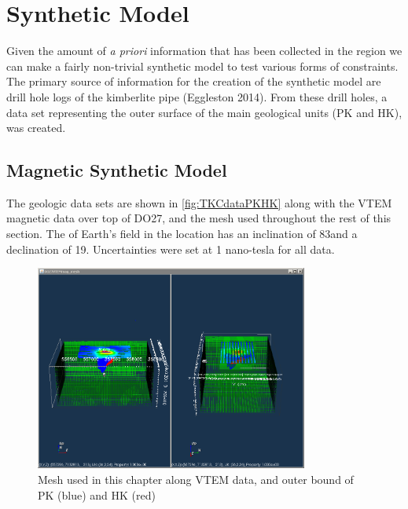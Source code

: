 \section{Synthetic Model }
\label{sec:Synthetic Model:TKC}
%
Given the amount of \emph{a priori} information that has been collected in the region we can make a fairly non-trivial synthetic model to test various forms of constraints. The primary source of information for the creation of the synthetic model are drill hole logs of the kimberlite pipe (Eggleston 2014). From these drill holes, a data set representing the outer surface of the main geological units (PK and HK), was created. 


\subsection{Magnetic Synthetic Model }
\label{subsec:Synthetic Model:MAG:TKC}

The geologic data sets are shown in \autoref{fig:TKCdataPKHK} along with the VTEM magnetic data over top of DO27, and the mesh used throughout the rest of this section. The of Earth's field in the location has an inclination of 83\degree and a declination of 19\degree. Uncertainties were set at 1 nano-tesla for all data.
%
\begin{figure} [h]
   \centering
   \includegraphics[width=0.8\textwidth]{images/TKC/TKCdataPKHK.PNG}
   \caption{Mesh used in this chapter along VTEM data, and outer bound of PK (blue) and HK (red)}
   \label{fig:TKCdataPKHK}
\end{figure}
%

